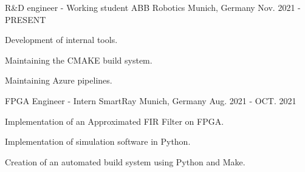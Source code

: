 


\begin{cventries}


    \cventry
    {R\&D engineer - Working student} %
    {ABB Robotics} %
    {Munich, Germany} %
    {Nov. 2021 - PRESENT} %
    { %
        \begin{cvitems}
            \item {Development of internal tools.}
            \item {Maintaining the CMAKE build system.}
            \item {Maintaining Azure pipelines.}
        \end{cvitems}
    }


    \cventry
    {FPGA Engineer - Intern} %
    {SmartRay} %
    {Munich, Germany} %
    {Aug. 2021 - OCT. 2021} %
    { %
        \begin{cvitems}
            \item {Implementation of an Approximated FIR Filter on FPGA.}
            \item {Implementation of simulation software in Python.}
            \item {Creation of an automated build system using Python and Make.}
        \end{cvitems}
    }



\end{cventries}
